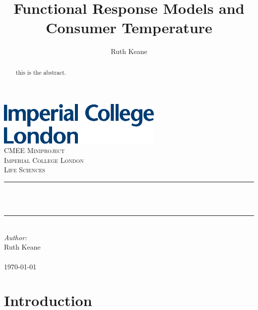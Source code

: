 \documentclass{article}
\newcommand{\HRule}{\rule{\linewidth}{1mm}}
\begin{document}
\title{Functional Response Models and Consumer Temperature}%
\author{Ruth Keane}
\begin{titlepage}
\includegraphics[width=8cm]{logo.eps}\\[1cm] 
\center 
\textsc{\LARGE CMEE Miniproject}\\[1.5cm] 
\textsc{\Large Imperial College London}\\[0.5cm]
\textsc{\large Life Sciences}\\[0.5cm] 
\makeatletter
\HRule \\[0.4cm]
{ \huge \bfseries \@title}\\[0.4cm] %
\HRule \\[1.5cm]
\makeatother
\Large \emph{Author:}\\
Ruth Keane \\[3cm] %
\\
{\large \today}\\[2cm] %
\vfill %
\clearpage
\end{titlepage}
\linenumbers
\begin{abstract}
this is the abstract.
\end{abstract}
\section{Introduction}
\end{document}
